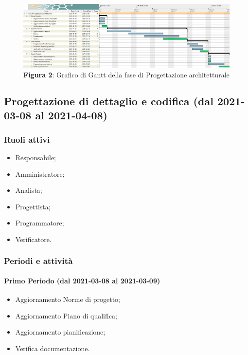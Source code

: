 \begin{landscape}
	\begin{figure}[H]
		\centering
		\includegraphics[width=\linewidth]{res/images/ganttFase2.png}
		\caption*{\textbf{Figura 2}{: Grafico di Gantt della fase di Progettazione architetturale}}
		\label{fig:Gantt Analisi dei requisiti}
	\end{figure}
\end{landscape}

\subsection{Progettazione di dettaglio e codifica (dal 2021-03-08 al 2021-04-08)}

\subsubsection{Ruoli attivi}
\begin{itemize}
	\item Responsabile;
	\item Amministratore;
	\item Analista;
	\item Progettista;
	\item Programmatore;
	\item Verificatore.
\end{itemize}

\subsubsection{Periodi e attività}

\paragraph{Primo Periodo (dal 2021-03-08 al 2021-03-09)}
\begin{itemize}
	\item Aggiornamento Norme di progetto;
	\item Aggiornamento Piano di qualifica;
	\item Aggiornamento pianificazione;
	\item Verifica documentazione.
\end{itemize}

